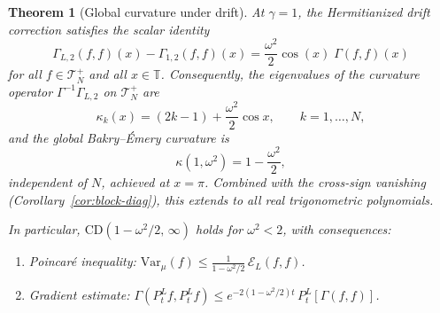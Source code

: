 \documentclass[11pt,a4paper]{article}
\theoremstyle{plain}
\newtheorem{theorem}{Theorem}[section]
\theoremstyle{definition}
\theoremstyle{remark}
\newcommand{\T}{\mathbb{T}}
\newcommand{\Var}{\mathrm{Var}}
\begin{document}
\begin{theorem}[Global curvature under drift]\label{thm:global-drift}
At $\gamma = 1$, the Hermitianized drift correction satisfies
the scalar identity
\begin{equation}\label{eq:drift-scalar}
  \Gamma_{L,2}(f,f)(x) - \Gamma_{1,2}(f,f)(x)
  = \frac{\omega^2}{2}\cos(x)\;\Gamma(f,f)(x)
\end{equation}
for all $f \in \mathcal{T}_N^+$ and all $x \in \T$.
Consequently, the eigenvalues of the curvature operator
$\Gamma^{-1}\Gamma_{L,2}$ on $\mathcal{T}_N^+$ are
\begin{equation}\label{eq:drift-eigenvalues}
  \kappa_k(x) = (2k-1) + \frac{\omega^2}{2}\cos x,
  \qquad k = 1,\ldots,N,
\end{equation}
and the global Bakry--\'Emery curvature is
\begin{equation}\label{eq:global-kappa}
  \kappa(1,\omega^2) = 1 - \frac{\omega^2}{2},
\end{equation}
independent of $N$, achieved at $x = \pi$.
Combined with the cross-sign vanishing
(Corollary~\ref{cor:block-diag}), this extends to all real
trigonometric polynomials.

In particular, $\mathrm{CD}(1-\omega^2/2,\,\infty)$ holds for
$\omega^2 < 2$, with consequences:
\begin{enumerate}[label=(\roman*)]
\item Poincar\'e inequality:
  $\Var_\mu(f) \leq \frac{1}{1-\omega^2/2}\,\mathcal{E}_L(f,f)$.
\item Gradient estimate:
  $\Gamma(P_t^L f, P_t^L f)
  \leq e^{-2(1-\omega^2/2)t}\,P_t^L[\Gamma(f,f)]$.
\end{enumerate}
\end{theorem}
\end{document}
